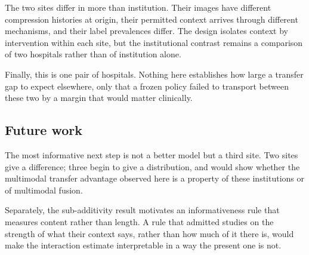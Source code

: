 The two sites differ in more than institution. Their images have different
compression histories at origin, their permitted context arrives through
different mechanisms, and their label prevalences differ. The design isolates
context by intervention within each site, but the institutional contrast remains
a comparison of two hospitals rather than of institution alone.

Finally, this is one pair of hospitals. Nothing here establishes how large a
transfer gap to expect elsewhere, only that a frozen policy failed to transport
between these two by a margin that would matter clinically.

\subsection{Future work}
\label{sec:future-work}

The most informative next step is not a better model but a third site. Two sites
give a difference; three begin to give a distribution, and would show whether
the multimodal transfer advantage observed here is a property of these
institutions or of multimodal fusion.

Separately, the sub-additivity result motivates an informativeness rule that
measures content rather than length. A rule that admitted studies on the
strength of what their context says, rather than how much of it there is, would
make the interaction estimate interpretable in a way the present one is not.

